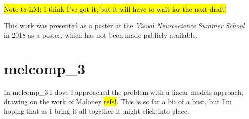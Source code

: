 \hl{Note to LM: I think I've got it, but it will have to wait for the next draft!}

This work was presented as a poster at the \emph{Visual Neuroscience Summer School} in 2018 as a poster, which has not been made publicly available.

\section{melcomp\_3}

In melcomp\_3 I dove I approached the problem with a linear models approach, drawing on the work of Maloney \hl{refs!}. This is so far a bit of a bust, but I'm hoping that as I bring it all together it might click into place.


